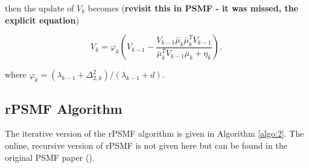 \documentclass{mldsmsc}
\begin{document}
\noindent then the update of $V_k$ becomes (\textbf{revisit this in PSMF - it was missed, the explicit equation})

\begin{equation}
    V_k = \varphi_k \left(V_{k-1} - \frac{V_{k-1} \bar{\mu}_k \bar{\mu}_k^T V_{k-1}}{\bar{\mu}_k^T V_{k-1} \bar{\mu}_k + \eta_k}\right),
\end{equation}

\noindent where $\varphi_k = \left( \lambda_{k-1} + \Delta^2_{2,k} \right) / \left( \lambda_{k-1} + d \right)$.

\subsection{rPSMF Algorithm}

The iterative version of the rPSMF algorithm is given in Algorithm \ref{algo:2}. The online, recursive version of rPSMF is not given here but can be found in the original PSMF paper (\cite{akyildiz2021probabilistic}).
\end{document}
